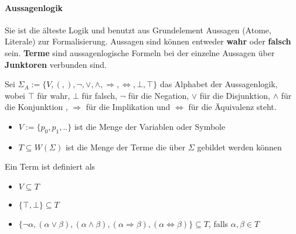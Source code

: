 

\paragraph{Aussagenlogik}
Sie ist die älteste Logik und benutzt aus Grundelement Aussagen (Atome,
Literale) zur Formalisierung. Aussagen sind können entweder \textbf{wahr}
oder \textbf{falsch} sein. \textbf{Terme} sind aussagenlogische Formeln
bei der einzelne Aussagen über \textbf{Junktoren} verbunden sind.~\cite{heinemann2013logik}

\begin{defi}
  Sei $\Sigma_A := \{V,(,),\neg,\vee,\wedge,\Rightarrow,\Leftrightarrow,\bot,\top\}$ das Alphabet der Aussagenlogik, wobei $\top$ für
wahr, $\bot$ für falsch, $\neg$ für die Negation, $\vee$ für die Disjunktion, $\wedge$ für die
Konjunktion , $\Rightarrow$ für die Implikation und $\Leftrightarrow$ für die Äquivalenz steht.
\begin{itemize}
\item $V:=\{p_0,p_1,..\}$  ist die Menge der Variablen oder Symbole
\item $T\subseteq W(\Sigma)$  ist die Menge der Terme die über $\Sigma$ gebildet werden können 
\end{itemize}
\end{defi}

\begin{defi}
  Ein Term ist definiert als
  \begin{itemize}
  \item $V\subseteq T$
  \item $\{\top,\bot\}\subseteq T$
  \item $\{\neg\alpha,(\alpha\vee\beta),(\alpha\wedge\beta),(\alpha\Rightarrow\beta),(\alpha\Leftrightarrow\beta)\}\subseteq T$, falls $\alpha,\beta\in T$
  \end{itemize}
\end{defi}

